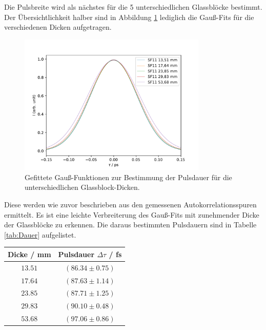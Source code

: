         Die Pulsbreite wird als nächstes für die 5 unterschiedlichen Glassblöcke bestimmt. Der Übersichtlichkeit halber sind in Abbildung \ref{fig:Glass} lediglich die Gauß-Fits für die verschiedenen Dicken aufgetragen.
        \begin{figure}
            \centering
            \includegraphics[width = 0.8\textwidth]{pictures/Puls_Glass.pdf}
            \caption{Gefittete Gauß-Funktionen zur Bestimmung der Pulsdauer für die unterschiedlichen Glassblock-Dicken.}
            \label{fig:Glass}    
        \end{figure}        
        Diese werden wie zuvor beschrieben aus den gemessenen Autokorrelationsspuren ermittelt. Es ist eine leichte Verbreiterung des Gauß-Fits mit zunehmender Dicke der Glassblöcke zu erkennen. Die daraus bestimmten Pulsdauern sind in Tabelle \ref{tab:Dauer} aufgelistet.
        \begin{center}
            \label{tab:Dauer}
            \begin{tabular}{c c}
                \toprule
                Dicke / mm & Pulsdauer $\Delta\tau$ / fs \\
                \midrule
                $13.51$ & $(86.34 \pm 0.75)$ \\
                $17.64$ & $(87.63 \pm 1.14)$ \\
                $23.85$ & $(87.71 \pm 1.25)$ \\
                $29.83$ & $(90.10 \pm 0.48)$ \\
                $53.68$ & $(97.06 \pm 0.86)$ \\
                \bottomrule
            \end{tabular}
        \end{center}

